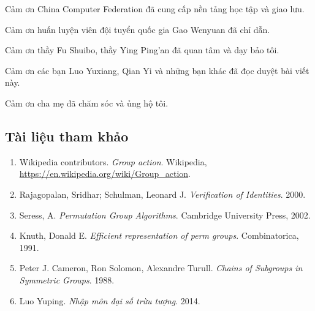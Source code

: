 \documentclass[11pt]{article}
\begin{document}
Cảm ơn China Computer Federation đã cung cấp nền tảng học tập và giao lưu.

Cảm ơn huấn luyện viên đội tuyển quốc gia Gao Wenyuan đã chỉ dẫn.

Cảm ơn thầy Fu Shuibo, thầy Ying Ping'an đã quan tâm và dạy bảo tôi.

Cảm ơn các bạn Luo Yuxiang, Qian Yi và những bạn khác đã đọc duyệt bài viết
này.

Cảm ơn cha mẹ đã chăm sóc và ủng hộ tôi.

\subsection*{Tài liệu tham khảo}

\begin{enumerate}
  \item Wikipedia contributors. \emph{Group action}. Wikipedia,
  \url{https://en.wikipedia.org/wiki/Group_action}.
  \item Rajagopalan, Sridhar; Schulman, Leonard J. \emph{Verification of
  Identities}. 2000.
  \item Seress, A. \emph{Permutation Group Algorithms}. Cambridge University
  Press, 2002.
  \item Knuth, Donald E. \emph{Efficient representation of perm groups}.
  Combinatorica, 1991.
  \item Peter J. Cameron, Ron Solomon, Alexandre Turull. \emph{Chains of
  Subgroups in Symmetric Groups}. 1988.
  \item Luo Yuping. \emph{Nhập môn đại số trừu tượng}. 2014.
\end{enumerate}
\end{document}
